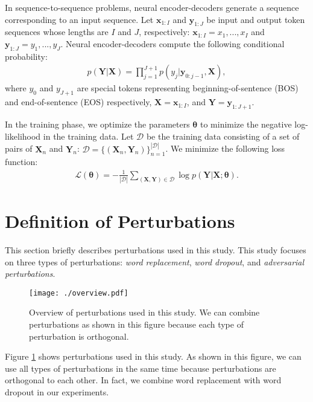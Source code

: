 \documentclass[11pt]{article}
\begin{document}
In sequence-to-sequence problems, neural encoder-decoders generate a sequence corresponding to an input sequence.
Let $\bm{x}_{1:I}$ and $\bm{y}_{1:J}$ be input and output token sequences whose lengths are $I$ and $J$, respectively: $\bm{x}_{1:I} = x_1, ..., x_I$ and $\bm{y}_{1:J} = y_1, ..., y_J$.
Neural encoder-decoders compute the following conditional probability:
\begin{align}
 p(\bm{Y}|\bm{X}) = \prod_{j=1}^{J+1} p(y_j | \bm{y}_{0:j-1}, \bm{X}),
\end{align}
where $y_0$ and $y_{J+1}$ are special tokens representing beginning-of-sentence (BOS) and end-of-sentence (EOS) respectively, $\bm{X} = \bm{x}_{1:I}$, and $\bm{Y} = \bm{y}_{1:J+1}$.


In the training phase, we optimize the parameters $\bm{\theta}$ to minimize the negative log-likelihood in the training data.
Let $\mathcal{D}$ be the training data consisting of a set of pairs of $\bm{X}_n$ and $\bm{Y}_n$: $\mathcal{D} = \{ (\bm{X}_{n}, \bm{Y}_{n}) \}_{n=1}^{|\mathcal{D}|}$.
We minimize the following loss function:
\begin{align}
 \label{eq:loss}
 \mathcal{L}(\bm{\theta}) = -\frac{1}{|\mathcal{D}|} \sum_{(\bm{X}, \bm{Y}) \in \mathcal{D}} \log p(\bm{Y}|\bm{X}; \bm{\theta}).
\end{align}


\section{Definition of Perturbations}\label{sec:perturbation}
This section briefly describes perturbations used in this study.
This study focuses on three types of perturbations: \textit{word replacement}, \textit{word dropout}, and \textit{adversarial perturbations}.
\begin{figure}[!t]
  \centering 
  \texttt{[image: ./overview.pdf]}
   \caption{Overview of perturbations used in this study. We can combine perturbations as shown in this figure because each type of perturbation is orthogonal.}
   \label{fig:overview}
\end{figure}
Figure \ref{fig:overview} shows perturbations used in this study.
As shown in this figure, we can use all types of perturbations in the same time because perturbations are orthogonal to each other.
In fact, we combine word replacement with word dropout in our experiments.
\end{document}
